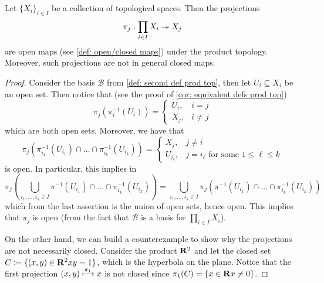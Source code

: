 \begin{lemma}
    \label{lem:projections-open-under-product-top}
    Let \(\{X_i\}_{i \in I} \) be a collection of topological spaces. Then the
    projections
    \[
        \pi_j: \prod_{i \in I} X_i \twoheadrightarrow X_j
    \]
    are open maps (see \cref{def: open/closed maps}) under the product
    topology. Moreover, such projections are not in general closed maps.
\end{lemma}

\begin{proof}
    Consider the basis \(\mathcal B\) from \cref{def: second def prod top}, then
    let \(U_i \subseteq X_i\) be an open set. Then notice that (see the proof of
    \cref{cor: equivalent defs prod top})
    \[
        \pi_j(\pi_i^{-1}(U_i)) =
        \begin{cases}
            U_i, & i = j    \\
            X_j, & i \neq j
        \end{cases}
    \]
    which are both open sets. Moreover, we have that
    \[
        \pi_j \left(\pi_{i_1}^{-1}(U_{i_1}) \cap \dots \cap \pi_{i_k}^{-1}(U_{i_k})
        \right) =
        \begin{cases}
            X_j,        & j \neq i                                        \\
            U_{i_\ell}, & j = i_\ell \text{ for some } 1 \leq \ell \leq k
        \end{cases}
    \]
    is open. In particular, this implies in
    \[
        \pi_j \left( \bigcup_{i_1, \dots, i_k \in I} \pi^{-1}(U_{i_1}) \cap \dots
        \cap \pi_{i_k}^{-1}(U_{i_k}) \right)
        =
        \bigcup_{i_1, \dots, i_k \in I} \pi_j \left( \pi^{-1}(U_{i_1}) \cap \dots
        \cap \pi_{i_k}^{-1}(U_{i_k}) \right)
    \]
    which from the last assertion is the union of open sets, hence open. This
    implies that \(\pi_j\) is open (from the fact that \(\mathcal B\) is a basis
    for \(\prod_{i \in I} X_i\)).

    On the other hand, we can build a counterexample to show why the projections
    are not necessarily closed. Consider the product \(\mathbf{R}^2\) and let the
    closed set \(C \coloneq \{(x, y) \in \mathbf{R}^2 \relax x y = 1\}\), which is the
    hyperbola on the plane. Notice that the first projection \((x, y)
    \xmapsto{\pi_1} x\) is not closed since \(\pi_1(C) = \{x \in \mathbf{R} \relax x
    \neq 0\}\).
\end{proof}

